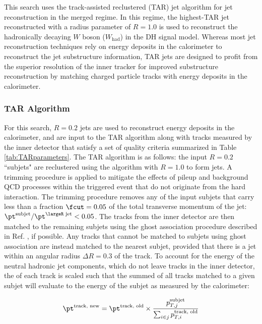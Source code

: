This search uses the track-assisted reclustered (TAR) jet algorithm \cite{ATL-PHYS-PUB-2018-012} for \largeR jet reconstruction in the merged regime. In this regime, the highest-\pt TAR jet reconstructed with a radius parameter of \(R=1.0\) is used to reconstruct the hadronically decaying \(W\) boson (\(W_\text{had}\)) in the DH signal model. Whereas most \largeR jet reconstruction techniques rely on energy deposits in the calorimeter to reconstruct the jet substructure information, TAR jets are designed to profit from the superior resolution of the inner tracker for improved substructure reconstruction by matching charged particle tracks with energy deposits in the calorimeter. 

\subsubsection{TAR Algorithm}
\label{sec:TAR_algo}

For this search, \(R=0.2\) \smallR jets are used to reconstruct energy deposits in the calorimeter, and are input to the TAR algorithm along with tracks measured by the inner detector that satisfy a set of quality criteria summarized in Table \ref{tab:TARparameters}. The TAR algorithm \cite{ATL-PHYS-PUB-2018-012} is as follows: the input \(R=0.2\) \smallR ``subjets" are reclustered using the \akt algorithm with \(R=1.0\) to form \largeR jets. A trimming procedure is applied to mitigate the effects of pileup and background QCD processes within the triggered event that do not originate from the hard interaction. The trimming procedure removes any of the input subjets that carry less than a fraction \(\fcut=0.05\) of the total transverse momentum of the \largeR jet: \(\pt^\text{subjet}/\pt^\text{\largeR jet} < 0.05\).  The tracks from the inner detector are then matched to the remaining \smallR subjets using the ghost association procedure described in Ref. \cite{ghost_association_2008}, if possible. Any tracks that cannot be matched to subjets using ghost association are instead matched to the nearest subjet, provided that there is a jet within an angular radius \(\Delta R=0.3\) of the track. To account for the energy of the neutral hadronic jet components, which do not leave tracks in the inner detector, the \pt of each track is scaled such that the summed \pt of all tracks matched to a given subjet will evaluate to the energy of the subjet as measured by the calorimeter:

\begin{equation}
\label{eq:tar_track_pt_scaling}
\pt^\text{track, new} = \pt^\text{track, old} \times \frac{p_{T,j}^\text{subjet}}{\sum_{i \in j}p_{T, i}^\text{track, old}}
\end{equation}

